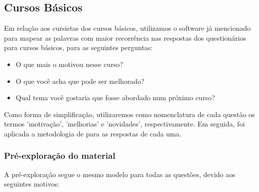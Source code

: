 \subsection{Cursos Básicos}

Em relação aos cursistas dos cursos básicos, utilizamos o software já mencionado para mapear as palavras com maior recorrência nas respostas dos questionários para cursos básicos, para as seguintes perguntas:

\begin{itemize}
\item O que mais o motivou nesse curso?
\item O que você acha que pode ser melhorado?
\item Qual tema você gostaria que fosse abordado num próximo curso?
\end{itemize}

Como forma de simplificação, utilizaremos como nomenclatura de cada questão os termos 'motivação', 'melhorias' e 'novidades', respectivamente. Em seguida, foi aplicada a metodologia de  para as respostas de cada uma.

\subsubsection*{Pré-exploração do material}

A pré-exploração segue o mesmo modelo para todas as questões, devido aos seguintes motivos:

